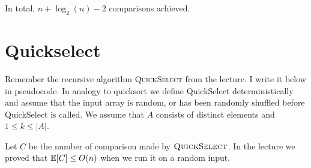 \documentclass[11pt,a4paper,oneside]{article}
\newcommand{\E}{\mathop{\mathbb{E\/}}}
\begin{document}
\begin{problem}{3}
	In total, $n + \log_2(n) - 2$ comparisons achieved.
\end{problem}

\section*{Quickselect}

Remember the recursive algorithm \textsc{QuickSelect} from the lecture. I write
it below in pseudocode. In analogy to quicksort we define QuickSelect deterministically
and assume that the input array is random, or has been randomly shuffled before
QuickSelect is called. We assume that $A$ consists of distinct elements and
$1 \leq k \leq |A|$.

Let $C$ be the number of comparison made by $\textsc{QuickSelect}$. In the 
lecture we proved that $\E[C] \leq O(n)$ when we run it on a random input.
\end{document}
